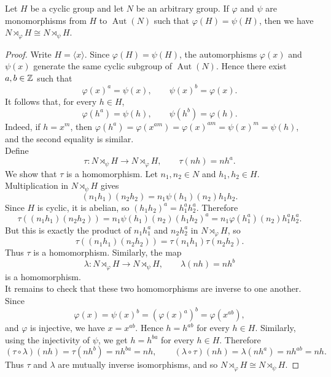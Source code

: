 \documentclass[../Odyssey_Project.tex]{subfiles}
\begin{document}
\begin{proposition}
\label{prop:2.11}
Let $H$ be a cyclic group and let $N$ be an arbitrary group. If $\varphi$ and $\psi$ are monomorphisms from $H$ to $\operatorname{Aut}(N)$ such that $\varphi(H) = \psi(H)$, then we have $N \rtimes_{\varphi} H \cong N \rtimes_{\psi} H$.
\end{proposition}
\begin{proof}
    Write $H = \langle x \rangle$. Since $\varphi(H) = \psi(H)$, the automorphisms $\varphi(x)$ and $\psi(x)$ generate the same cyclic subgroup of $\operatorname{Aut}(N)$. Hence there exist $a,b \in \mathbb{Z}$ such that
    \[
        \varphi(x)^a = \psi(x),
        \qquad
        \psi(x)^b = \varphi(x).
    \]
    It follows that, for every $h \in H$,
    \[
        \varphi(h^a) = \psi(h),
        \qquad
        \psi(h^b) = \varphi(h).
    \]
    Indeed, if $h = x^m$, then $\varphi(h^a) = \varphi(x^{am}) = \varphi(x)^{am} = \psi(x)^m = \psi(h)$, and the second equality is similar. \\
    Define
    \[
        \tau \colon N \rtimes_{\psi} H \to N \rtimes_{\varphi} H,
        \qquad
        \tau(nh) = nh^a.
    \]
    We show that $\tau$ is a homomorphism. Let $n_1,n_2 \in N$ and $h_1,h_2 \in H$. Multiplication in $N \rtimes_{\psi} H$ gives
    \[
        (n_1h_1)(n_2h_2) = n_1\psi(h_1)(n_2)h_1h_2.
    \]
    Since $H$ is cyclic, it is abelian, so $(h_1h_2)^a = h_1^a h_2^a$. Therefore
    \[
        \tau((n_1h_1)(n_2h_2))
        = n_1\psi(h_1)(n_2)(h_1h_2)^a
        = n_1\varphi(h_1^a)(n_2)h_1^a h_2^a.
    \]
    But this is exactly the product of $n_1h_1^a$ and $n_2h_2^a$ in $N \rtimes_{\varphi} H$, so
    \[
        \tau((n_1h_1)(n_2h_2)) = \tau(n_1h_1)\tau(n_2h_2).
    \]
    Thus $\tau$ is a homomorphism. Similarly, the map
    \[
        \lambda \colon N \rtimes_{\varphi} H \to N \rtimes_{\psi} H,
        \qquad
        \lambda(nh) = nh^b
    \]
    is a homomorphism. \\
    It remains to check that these two homomorphisms are inverse to one another. Since
    \[
        \varphi(x) = \psi(x)^b = (\varphi(x)^a)^b = \varphi(x^{ab}),
    \]
    and $\varphi$ is injective, we have $x = x^{ab}$. Hence $h = h^{ab}$ for every $h \in H$. Similarly, using the injectivity of $\psi$, we get $h = h^{ba}$ for every $h \in H$. Therefore
    \[
        (\tau \circ \lambda)(nh) = \tau(nh^b) = nh^{ba} = nh,
        \qquad
        (\lambda \circ \tau)(nh) = \lambda(nh^a) = nh^{ab} = nh.
    \]
    Thus $\tau$ and $\lambda$ are mutually inverse isomorphisms, and so $N \rtimes_{\varphi} H \cong N \rtimes_{\psi} H$.
\end{proof}
\end{document}
